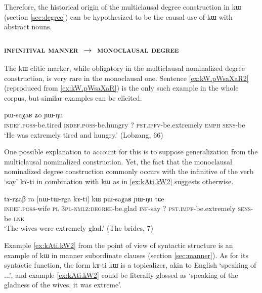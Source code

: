 \documentclass[oldfontcommands,oneside,a4paper,11pt]{article}
\newcommand{\ipa}[1]{{\phon #1}} %
\begin{document}
Therefore, the historical origin of the multiclausal   degree construction in \ipa{kɯ}   (section \ref{sec:degree})   can be hypothesized to be  the causal use of \ipa{kɯ}   with abstract nouns.  

 
 
 \subsubsection{ \textsc{infinitival manner} $\rightarrow$  \textsc{monoclausal degree}} \label{sec:manner2adj}
The  \ipa{kɯ} clitic marker, while obligatory in the multiclausal nominalized degree construction, is very rare in the monoclausal one. Sentence \ref{ex:kW.pWsaXaR2}  (reproduced from \ref{ex:kW.pWsaXaR}) is the only such example in the whole corpus, but similar examples can be elicited.

      \begin{exe}
  \ex  \label{ex:kW.pWsaXaR2}  
  \gll 
   [\ipa{tɤ-ɣɲat}  	\ipa{tɤ-mtsɯr}]  	\ipa{kɯ}  	\ipa{pɯ-saχaʁ}  	\ipa{ʑo}  	\ipa{ɲɯ-ŋu}  \\
      \textsc{indef.poss}-be.tired     \textsc{indef.poss}-be.hungry ?{ } \textsc{pst.ipfv}-be.extremely \textsc{emph} \textsc{sens}-be \\
      \glt `He was extremely tired and hungry.' (Lobzang, 66)
   \end{exe} 

One possible explanation to account for this is to suppose generalization from the multiclausal nominalized construction. Yet, the fact that the monoclausal nominalized degree construction commonly occurs with the infinitive of the verb `say' \ipa{kɤ-ti} in combination with   \ipa{kɯ} as in \ref{ex:kAti.kW2}  suggests otherwise.
      \begin{exe}
  \ex  \label{ex:kAti.kW2}  
  \gll 
\ipa{tɤ-rʑaβ} 	\ipa{ra} 	 	[\ipa{nɯ-tɯ-rga} 	\ipa{kɤ-ti}] 	\ipa{kɯ} 	\ipa{pɯ-saχaʁ} 	\ipa{ɲɯ-ŋu} 	\ipa{tɕe} \\
\textsc{indef.poss}-wife \textsc{pl} \textsc{3pl-nmlz:degree}-be.glad \textsc{inf}-say ?{ } \textsc{pst.impf}-be.extremely \textsc{sens}-be \textsc{lnk} \\
\glt `The wives were extremely glad.' (The brides, 7)
   \end{exe} 
   
Example \ref{ex:kAti.kW2}  from the point of view of syntactic structure is an example of \ipa{kɯ} in manner subordinate clauses (section \ref{sec:manner}). As for its syntactic function, the form \ipa{kɤ-ti kɯ} is a topicalizer, akin to English  `speaking of ...', and example \ref{ex:kAti.kW2}  could be literally glossed as `speaking of the gladness of the wives, it was extreme'. 
 
\end{document}
